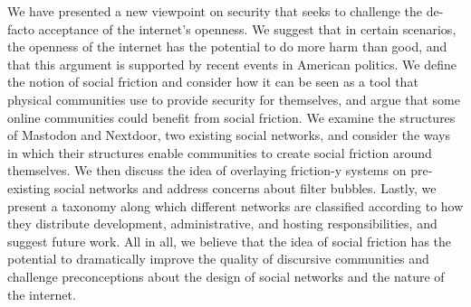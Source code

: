 \documentclass[sigconf,authordraft]{acmart}
\begin{document}
We have presented a new viewpoint on security that seeks to challenge the de-facto acceptance of the internet's openness. We suggest that in certain scenarios, the openness of the internet has the potential to do more harm than good, and that this argument is supported by recent events in American politics. We define the notion of social friction and consider how it can be seen as a tool that physical communities use to provide security for themselves, and argue that some online communities could benefit from social friction. We examine the structures of Mastodon and Nextdoor, two existing social networks, and consider the ways in which their structures enable communities to create social friction around themselves. We then discuss the idea of overlaying friction-y systems on pre-existing social networks and address concerns about filter bubbles. Lastly, we present a taxonomy along which different networks are classified according to how they distribute development, administrative, and hosting responsibilities, and suggest future work. All in all, we believe that the idea of social friction has the potential to dramatically improve the quality of discursive communities and challenge preconceptions about the design of social networks and the nature of the internet. 





\end{document}
